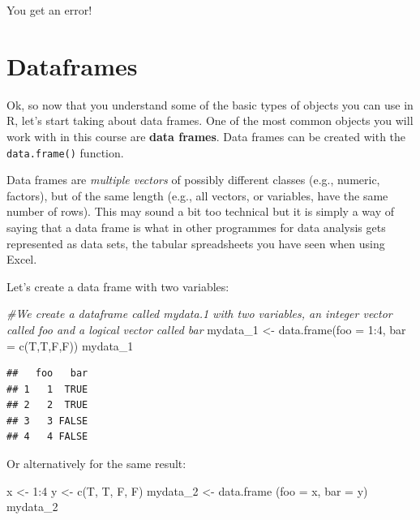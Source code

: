\documentclass[
]{book}
\newenvironment{Shaded}{\begin{snugshade}}{\end{snugshade}}
\newcommand{\AttributeTok}[1]{\textcolor[rgb]{0.77,0.63,0.00}{#1}}
\newcommand{\CommentTok}[1]{\textcolor[rgb]{0.56,0.35,0.01}{\textit{#1}}}
\newcommand{\DecValTok}[1]{\textcolor[rgb]{0.00,0.00,0.81}{#1}}
\newcommand{\FunctionTok}[1]{\textcolor[rgb]{0.00,0.00,0.00}{#1}}
\newcommand{\NormalTok}[1]{#1}
\newcommand{\OtherTok}[1]{\textcolor[rgb]{0.56,0.35,0.01}{#1}}
\newcommand{\SpecialCharTok}[1]{\textcolor[rgb]{0.00,0.00,0.00}{#1}}
\begin{document}
You get an error!

\hypertarget{dataframes}{%
\section{Dataframes}\label{dataframes}}

Ok, so now that you understand some of the basic types of objects you can use in R, let's start taking about data frames. One of the most common objects you will work with in this course are \textbf{data frames}. Data frames can be created with the \texttt{data.frame()} function.

Data frames are \emph{multiple vectors} of possibly different classes (e.g., numeric, factors), but of the same length (e.g., all vectors, or variables, have the same number of rows). This may sound a bit too technical but it is simply a way of saying that a data frame is what in other programmes for data analysis gets represented as data sets, the tabular spreadsheets you have seen when using Excel.

Let's create a data frame with two variables:

\begin{Shaded}
\begin{Highlighting}[]
\CommentTok{\#We create a dataframe called mydata.1 with two variables, an integer vector called foo and a logical vector called bar}
\NormalTok{mydata\_1 }\OtherTok{\textless{}{-}} \FunctionTok{data.frame}\NormalTok{(}\AttributeTok{foo =} \DecValTok{1}\SpecialCharTok{:}\DecValTok{4}\NormalTok{, }\AttributeTok{bar =} \FunctionTok{c}\NormalTok{(T,T,F,F))}
\NormalTok{mydata\_1}
\end{Highlighting}
\end{Shaded}

\begin{verbatim}
##   foo   bar
## 1   1  TRUE
## 2   2  TRUE
## 3   3 FALSE
## 4   4 FALSE
\end{verbatim}

Or alternatively for the same result:

\begin{Shaded}
\begin{Highlighting}[]
\NormalTok{x }\OtherTok{\textless{}{-}} \DecValTok{1}\SpecialCharTok{:}\DecValTok{4}
\NormalTok{y }\OtherTok{\textless{}{-}} \FunctionTok{c}\NormalTok{(T, T, F, F)}
\NormalTok{mydata\_2 }\OtherTok{\textless{}{-}} \FunctionTok{data.frame}\NormalTok{ (}\AttributeTok{foo =}\NormalTok{ x, }\AttributeTok{bar =}\NormalTok{ y)}
\NormalTok{mydata\_2}
\end{Highlighting}
\end{Shaded}
\end{document}
